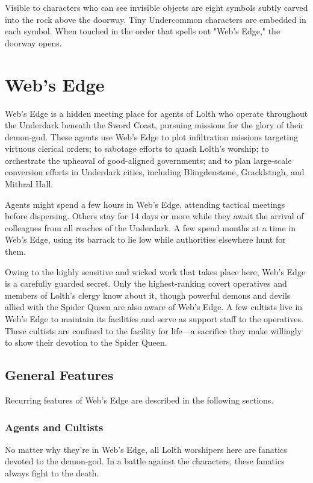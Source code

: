 \documentclass[10pt,a4paper,twoside,bg=print,twocolumn,openany,nodeprecatedcode]{dndbook}
\begin{document}
Visible to characters who can see invisible objects are eight symbols subtly carved into the rock above the doorway. Tiny Undercommon characters are embedded in each symbol. When touched in the order that spells out "Web's Edge," the doorway opens.

\section{Web's Edge}
Web's Edge is a hidden meeting place for agents of Lolth who operate throughout the Underdark beneath the Sword Coast, pursuing missions for the glory of their demon-god. These agents use Web's Edge to plot infiltration missions targeting virtuous clerical orders; to sabotage efforts to quash Lolth's worship; to orchestrate the upheaval of good-aligned governments; and to plan large-scale conversion efforts in Underdark cities, including Blingdenstone, Gracklstugh, and Mithral Hall.

Agents might spend a few hours in Web's Edge, attending tactical meetings before dispersing. Others stay for 14 days or more while they await the arrival of colleagues from all reaches of the Underdark. A few spend months at a time in Web's Edge, using its barrack to lie low while authorities elsewhere hunt for them.

Owing to the highly sensitive and wicked work that takes place here, Web's Edge is a carefully guarded secret. Only the highest-ranking covert operatives and members of Lolth's clergy know about it, though powerful demons and devils allied with the Spider Queen are also aware of Web's Edge. A few cultists live in Web's Edge to maintain its facilities and serve as support staff to the operatives. These cultists are confined to the facility for life—a sacrifice they make willingly to show their devotion to the Spider Queen.

\subsection{General Features}
Recurring features of Web's Edge are described in the following sections.

\subsubsection{Agents and Cultists}
No matter why they're in Web's Edge, all Lolth worshipers here are fanatics devoted to the demon-god. In a battle against the characters, these fanatics always fight to the death.
\end{document}
